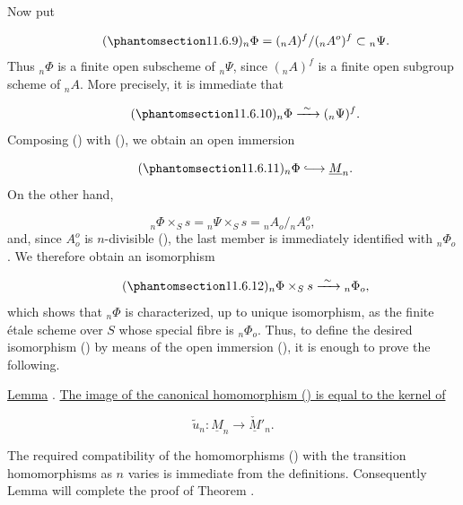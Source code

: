 Now put

\begin{equation}\tag{\SGARefTarget{sga7.sga7i.eix.n11-6-9}{11.6.9}}
{}_n\Phi=({}_nA)^f/({}_nA^o)^f\subset{}_n\Psi.
\end{equation}
Thus ${}_n\Phi$ is a finite open subscheme of ${}_n\Psi$, since
$({}_nA)^f$ is a finite open subgroup scheme of ${}_nA$. More
precisely, it is immediate that

\begin{equation}\tag{\SGARefTarget{sga7.sga7i.eix.n11-6-10}{11.6.10}}
{}_n\Phi\xrightarrow{\ \sim\ }({}_n\Psi)^f.
\end{equation}
Composing () with (), we obtain an open immersion

\begin{equation}\tag{\SGARefTarget{sga7.sga7i.eix.n11-6-11}{11.6.11}}
{}_n\Phi\lhook\joinrel\longrightarrow\underline M_n.
\end{equation}
On the other hand,

\begin{equation*}
{}_n\Phi\times_Ss={}_n\Psi\times_Ss={}_nA_o/{}_nA_o^o,
\end{equation*}
and, since $A_o^o$ is $n$-divisible (), the last member is
immediately identified with ${}_n\Phi_o$. We therefore obtain an
isomorphism

\begin{equation}\tag{\SGARefTarget{sga7.sga7i.eix.n11-6-12}{11.6.12}}
{}_n\Phi\times_Ss\xrightarrow{\ \sim\ }{}_n\Phi_o,
\end{equation}
which shows that ${}_n\Phi$ is characterized, up to unique isomorphism,
as the finite \'etale scheme over $S$ whose special fibre is
${}_n\Phi_o$. Thus, to define the desired isomorphism () by means
of the open immersion (), it is enough to prove the following.

\medskip
\noindent
\underline{Lemma} . \underline{The image of the canonical
homomorphism () is equal to the kernel of}

\begin{equation*}
\widetilde u_n:\underline M_n\longrightarrow\underline{\check M}'_n.
\end{equation*}

The required compatibility of the homomorphisms () with the
transition homomorphisms as $n$ varies is immediate from the
definitions. Consequently Lemma  will complete the proof of
Theorem .
